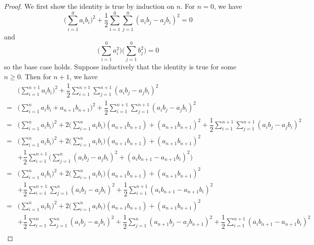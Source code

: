 \begin{proof}
  We first show the identity is true by induction on \(n\).
  For \(n = 0\), we have
  \[
    \bigg(\sum_{i = 1}^0 a_i b_i\bigg)^2 + \dfrac{1}{2} \sum_{i = 1}^0 \sum_{j = 1}^0 (a_i b_j - a_j b_i)^2 = 0
  \]
  and
  \[
    \bigg(\sum_{i = 1}^0 a_i^2\bigg) \bigg(\sum_{j = 1}^0 b_j^2\bigg) = 0
  \]
  so the base case holds.
  Suppose inductively that the identity is true for some \(n \geq 0\).
  Then for \(n + 1\), we have
  \begin{align*}
      & \bigg(\sum_{i = 1}^{n + 1} a_i b_i\bigg)^2 + \dfrac{1}{2} \sum_{i = 1}^{n + 1} \sum_{j = 1}^{n + 1} (a_i b_j - a_j b_i)^2                                                                                  \\
    = & \bigg(\sum_{i = 1}^n a_i b_i + a_{n + 1} b_{n + 1}\bigg)^2 + \dfrac{1}{2} \sum_{i = 1}^{n + 1} \sum_{j = 1}^{n + 1} (a_i b_j - a_j b_i)^2                                                                  \\
    = & \bigg(\sum_{i = 1}^n a_i b_i\bigg)^2 + 2 \bigg(\sum_{i = 1}^n a_i b_i\bigg) (a_{n + 1} b_{n + 1}) + (a_{n + 1} b_{n + 1})^2 + \dfrac{1}{2} \sum_{i = 1}^{n + 1} \sum_{j = 1}^{n + 1} (a_i b_j - a_j b_i)^2 \\
    = & \bigg(\sum_{i = 1}^n a_i b_i\bigg)^2 + 2 \bigg(\sum_{i = 1}^n a_i b_i\bigg) (a_{n + 1} b_{n + 1}) + (a_{n + 1} b_{n + 1})^2                                                                                \\
      & + \dfrac{1}{2} \sum_{i = 1}^{n + 1} \bigg(\sum_{j = 1}^n (a_i b_j - a_j b_i)^2 + (a_i b_{n + 1} - a_{n + 1} b_i)^2\bigg)                                                                                   \\
    = & \bigg(\sum_{i = 1}^n a_i b_i\bigg)^2 + 2 \bigg(\sum_{i = 1}^n a_i b_i\bigg) (a_{n + 1} b_{n + 1}) + (a_{n + 1} b_{n + 1})^2                                                                                \\
      & + \dfrac{1}{2} \sum_{i = 1}^{n + 1} \sum_{j = 1}^n (a_i b_j - a_j b_i)^2 + \dfrac{1}{2} \sum_{i = 1}^{n + 1} (a_i b_{n + 1} - a_{n + 1} b_i)^2                                                             \\
    = & \bigg(\sum_{i = 1}^n a_i b_i\bigg)^2 + 2 \bigg(\sum_{i = 1}^n a_i b_i\bigg) (a_{n + 1} b_{n + 1}) + (a_{n + 1} b_{n + 1})^2                                                                                \\
      & + \dfrac{1}{2} \sum_{i = 1}^n \sum_{j = 1}^n (a_i b_j - a_j b_i)^2 + \dfrac{1}{2} \sum_{j = 1}^n (a_{n + 1} b_j - a_j b_{n + 1})^2 + \dfrac{1}{2} \sum_{i = 1}^{n + 1} (a_i b_{n + 1} - a_{n + 1} b_i)^2   \\

\end{align*}
\end{proof}
